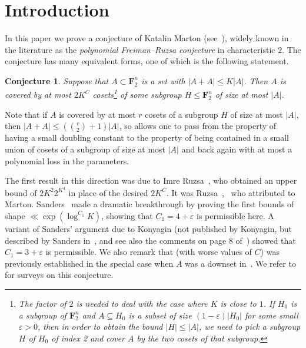 \documentclass[12pt,reqno,tbtags]{amsart}
\newtheorem{conjecture}[theorem]{Conjecture}
\theoremstyle{definition}
\theoremstyle{remark}
\renewcommand{\leq}{\leqslant}
\def\F{\mathbf{F}}
\def\eps{\varepsilon}
\numberwithin{equation}{section}
\begin{document}
\maketitle



\section{Introduction}
In this paper we prove a conjecture of Katalin Marton (see~\cite{ruzsa-fin-field}), widely known in the literature as the \emph{polynomial Freiman--Ruzsa conjecture} in characteristic $2$.
The conjecture has many equivalent forms, one of which is the following statement.

\begin{conjecture}\label{pfr-conj}
 Suppose that $A \subset \F_2^n$ is a set with $|A + A| \leq K|A|$. Then $A$ is covered by at most $2 K^{C}$ cosets\footnote{The factor of $2$ is needed to deal with the case where $K$ is close to $1$.  If $H_0$ is a subgroup of $\F_2^n$ and $A \subseteq H_0$ is a subset of size $(1-\eps)|H_0|$ for some small $\eps>0$, then in order to obtain the bound $|H|\leq|A|$, we need to pick a subgroup $H$ of $H_0$ of index 2 and cover $A$ by the two cosets of that subgroup.} of some subgroup $H \leq \F_2^n$ of size at most $|A|$.
\end{conjecture}

\noindent Note that if $A$ is covered by at most $r$ cosets of a subgroup $H$ of size at most $|A|$, then $|A+A|\leq (\binom r2+1)|A|$, so  allows one to pass from the property of having a small doubling constant to the property of being contained in a small union of cosets of a subgroup of size at most $|A|$ and back again with at most a polynomial loss in the parameters.

The first result in this direction was due to Imre Ruzsa~\cite{ruzsa-fin-field}, who obtained an upper bound of $2K^2 2^{K^4}$ in place of the desired $2K^C$. It was Ruzsa~\cite{ruzsa-fin-field},~\cite[Conjecture 2.2.2]{ruzsa-sumsets-survey} who attributed  to Marton. Sanders~\cite{sanders} made a dramatic breakthrough by proving the first bounds of shape $\ll \exp(\log^{C_1} K)$, showing that $C_1 = 4 + \eps$ is permissible here. A variant of Sanders' argument due to Konyagin (not published by Konyagin, but described by Sanders in~\cite{sanders2}, and see also the comments on page 8 of~\cite{gmt}) showed that $C_1 = 3 + \eps$ is permissible. We also remark that  (with worse values of $C$) was previously established in the special case when $A$ was a downset in~\cite{gt-freiman}. We refer to~\cite{green-fin-fields, green-pfr-note, lovett-survey} for surveys on this conjecture.
\end{document}
